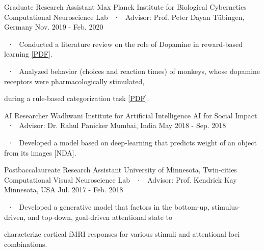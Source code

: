 \begin{cventries}
  \cventryLab
    {Graduate Research Assistant} %
    {Max Planck Institute for Biological Cybernetics} %
    {Computational Neuroscience Lab ~·~ Advisor: Prof. Peter Dayan}%
    {Tübingen, Germany} %
    {Nov. 2019 - Feb. 2020}
    {%
    \begin{cvitems}
    \item ~·~ Conducted a literature review on the role of Dopamine in reward-based learning \href{https://drive.google.com/file/d/1OEo0gj_9koHtPa58SKOdccETzw48jGHZ/view?usp=sharing}{[PDF]}. 
    \item ~·~ Analyzed behavior (choices and reaction times) of monkeys, whose dopamine receptors were pharmacologically stimulated, 
     \item \phantom{~·~} during a rule-based categorization task \href{https://drive.google.com/file/d/1bqvoALW3b3Ovm6vpJbzl-hcy932nN__t/view?usp=sharing}{[PDF]}. 
    \end{cvitems}
    }

  \cventryLab
    {AI Researcher} %
    {Wadhwani Institute for Artificial Intelligence} %
    {AI for Social Impact ~·~ Advisor: Dr. Rahul Panicker} %
    {Mumbai, India} %
    {May 2018 - Sep. 2018} %
    { %
      \begin{cvitems}
      \item ~·~ Developed a model based on deep-learning that predicts weight of an object from its images [NDA].
      \end{cvitems}
    }
    
  \cventryLab
    {Postbaccalaureate Research Assistant} %
    {University of Minnesota, Twin-cities} %
    {Computational Visual Neuroscience Lab ~·~ Advisor: Prof. Kendrick Kay} %
    {Minnesota, USA} %
    {Jul. 2017 - Feb. 2018} %
    { %
      \begin{cvitems}
      \item ~·~  Developed a generative model that factors in the bottom-up, stimulus-driven, and top-down, goal-driven attentional state to 
       \item \phantom{~·~} characterize cortical fMRI responses for various stimuli and attentional loci combinations. 
      \end{cvitems}
    }
    

\end{cventries}
